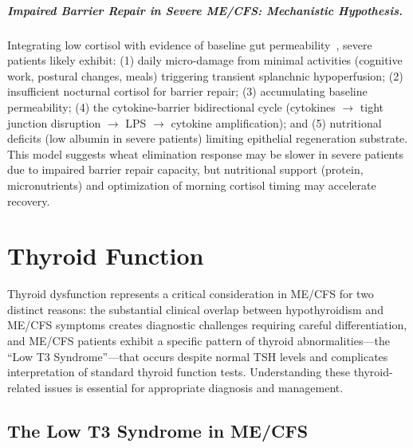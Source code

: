 \subparagraph{Impaired Barrier Repair in Severe ME/CFS: Mechanistic Hypothesis.}
Integrating low cortisol with evidence of baseline gut permeability~\cite{GutPermeability2023}, severe patients likely exhibit: (1) daily micro-damage from minimal activities (cognitive work, postural changes, meals) triggering transient splanchnic hypoperfusion; (2) insufficient nocturnal cortisol for barrier repair; (3) accumulating baseline permeability; (4) the cytokine-barrier bidirectional cycle (cytokines $\rightarrow$ tight junction disruption $\rightarrow$ LPS $\rightarrow$ cytokine amplification); and (5) nutritional deficits (low albumin in severe patients) limiting epithelial regeneration substrate. This model suggests wheat elimination response may be slower in severe patients due to impaired barrier repair capacity, but nutritional support (protein, micronutrients) and optimization of morning cortisol timing may accelerate recovery.

\section{Thyroid Function}
\label{sec:thyroid}

Thyroid dysfunction represents a critical consideration in ME/CFS for two distinct reasons: the substantial clinical overlap between hypothyroidism and ME/CFS symptoms creates diagnostic challenges requiring careful differentiation, and ME/CFS patients exhibit a specific pattern of thyroid abnormalities---the ``Low T3 Syndrome''---that occurs despite normal TSH levels and complicates interpretation of standard thyroid function tests. Understanding these thyroid-related issues is essential for appropriate diagnosis and management.

\subsection{The Low T3 Syndrome in ME/CFS}

